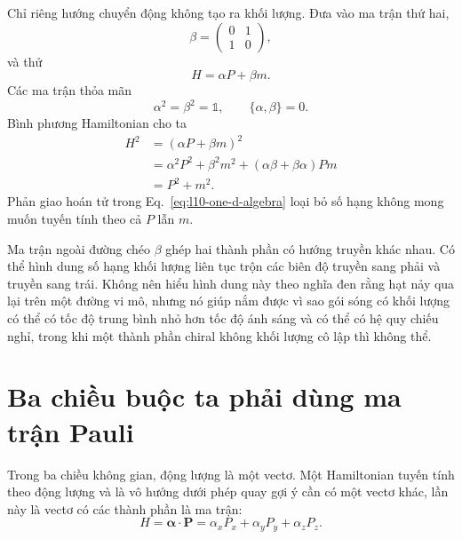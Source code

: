 Chỉ riêng hướng chuyển động không tạo ra khối lượng. Đưa vào ma trận thứ hai,
\begin{equation}
\beta=
\begin{pmatrix}
0&1\\
1&0
\end{pmatrix},
\end{equation}
và thử
\begin{equation}
H=\alpha P+\beta m.
\label{eq:l10-massive-one-d}
\end{equation}
Các ma trận thỏa mãn
\begin{equation}
\alpha^2=\beta^2=\mathbb{1},
\qquad
\{\alpha,\beta\}=0.
\label{eq:l10-one-d-algebra}
\end{equation}
Bình phương Hamiltonian cho ta
\begin{align}
H^2
&=(\alpha P+\beta m)^2\\
&=\alpha^2P^2+\beta^2m^2
  +(\alpha\beta+\beta\alpha)Pm\\
&=P^2+m^2.
\label{eq:l10-one-d-dispersion}
\end{align}
Phản giao hoán tử trong Eq.~\eqref{eq:l10-one-d-algebra} loại bỏ số hạng không mong muốn tuyến tính theo cả \(P\) lẫn \(m\).

Ma trận ngoài đường chéo \(\beta\) ghép hai thành phần có hướng truyền khác nhau. Có thể hình dung số hạng khối lượng liên tục trộn các biên độ truyền sang phải và truyền sang trái. Không nên hiểu hình dung này theo nghĩa đen rằng hạt nảy qua lại trên một đường vi mô, nhưng nó giúp nắm được vì sao gói sóng có khối lượng có thể có tốc độ trung bình nhỏ hơn tốc độ ánh sáng và có thể có hệ quy chiếu nghỉ, trong khi một thành phần chiral không khối lượng cô lập thì không thể.

\begin{classroomqa}
\end{classroomqa}

\section{Ba chiều buộc ta phải dùng ma trận Pauli}

Trong ba chiều không gian, động lượng là một vectơ. Một Hamiltonian tuyến tính theo động lượng và là vô hướng dưới phép quay gợi ý cần có một vectơ khác, lần này là vectơ có các thành phần là ma trận:
\begin{equation}
H=\boldsymbol{\alpha}\cdot\mathbf P
=\alpha_xP_x+\alpha_yP_y+\alpha_zP_z.
\label{eq:l10-three-d-ansatz}
\end{equation}

